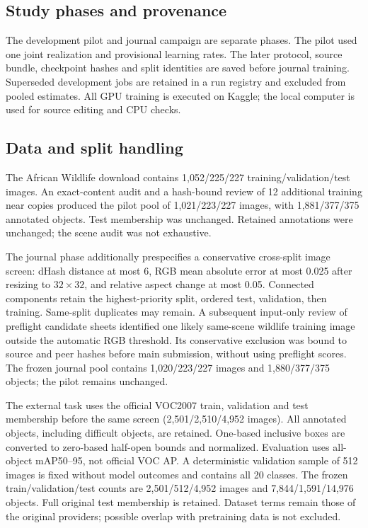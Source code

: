 \documentclass[11pt,a4paper]{article}
\begin{document}
\subsection{Study phases and provenance}
The development pilot and journal campaign are separate phases. The pilot used one joint realization and provisional learning rates. The later protocol, source bundle, checkpoint hashes and split identities are saved before journal training. Superseded development jobs are retained in a run registry and excluded from pooled estimates. All GPU training is executed on Kaggle; the local computer is used for source editing and CPU checks.

\subsection{Data and split handling}
The African Wildlife download \cite{wildlifeData} contains 1,052/225/227 training/validation/test images. An exact-content audit and a hash-bound review of 12 additional training near copies produced the pilot pool of 1,021/223/227 images, with 1,881/377/375 annotated objects. Test membership was unchanged. Retained annotations were unchanged; the scene audit was not exhaustive.

The journal phase additionally prespecifies a conservative cross-split image screen: dHash distance at most 6, RGB mean absolute error at most 0.025 after resizing to $32\times32$, and relative aspect change at most 0.05. Connected components retain the highest-priority split, ordered test, validation, then training. Same-split duplicates may remain. A subsequent input-only review of preflight candidate sheets identified one likely same-scene wildlife training image outside the automatic RGB threshold. Its conservative exclusion was bound to source and peer hashes before main submission, without using preflight scores. The frozen journal pool contains 1,020/223/227 images and 1,880/377/375 objects; the pilot remains unchanged.

The external task uses the official VOC2007 train, validation and test membership \cite{everingham2010} before the same screen (2,501/2,510/4,952 images). All annotated objects, including difficult objects, are retained. One-based inclusive boxes are converted to zero-based half-open bounds and normalized. Evaluation uses all-object mAP50--95, not official VOC AP. A deterministic validation sample of 512 images is fixed without model outcomes and contains all 20 classes. The frozen train/validation/test counts are 2,501/512/4,952 images and 7,844/1,591/14,976 objects. Full original test membership is retained. Dataset terms remain those of the original providers; possible overlap with pretraining data is not excluded.
\end{document}
